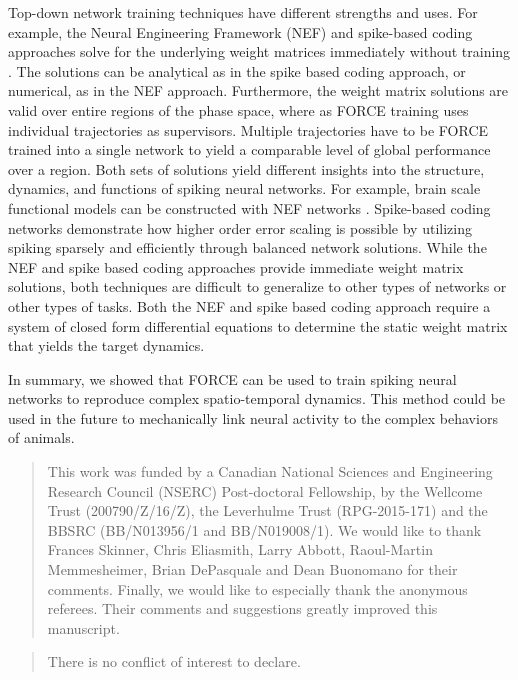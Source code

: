\documentclass[11pt]{article} %
\begin{document}
Top-down network training techniques have different strengths and uses.   
For example, the Neural Engineering Framework (NEF) and spike-based coding 
approaches solve for the underlying weight matrices immediately without 
training \cite{Deneve1,Deneve2,Ali,Chris1,Chris2}.  
The solutions can be analytical as in the spike based coding approach, 
or numerical, as in the NEF approach.  Furthermore, the weight matrix solutions 
are valid over entire regions of the phase space, where as FORCE training uses individual 
trajectories as supervisors.  
Multiple trajectories have to be FORCE trained into a single network to yield a 
comparable level of global performance over a region.   
Both sets of solutions yield different insights into the structure, dynamics, 
and functions of spiking neural networks.  
For example, brain scale functional models can be constructed with 
NEF networks \cite{Chris1}.  Spike-based coding networks demonstrate 
how higher order error scaling is possible by utilizing spiking sparsely and 
efficiently through balanced network solutions.  
While the NEF and spike based coding approaches provide immediate 
weight matrix solutions, both techniques are difficult to generalize 
to other types of networks or other types of tasks.  
Both the NEF and spike based coding approach require a system of closed 
form differential equations to determine the static weight matrix 
that yields the target dynamics.  

In summary, we showed that FORCE can be used to train spiking 
neural networks to reproduce complex spatio-temporal dynamics. 
This method could be used in the future to mechanically link neural 
activity to the complex behaviors of animals.

\renewcommand{\abstractname}{Acknowledgements}
\begin{abstract}
This work was funded by a Canadian National Sciences and 
Engineering Research Council (NSERC) Post-doctoral Fellowship, 
by the Wellcome Trust (200790/Z/16/Z), the Leverhulme Trust (RPG-2015-171) 
and the BBSRC (BB/N013956/1 and BB/N019008/1).  
We would like to thank Frances Skinner, Chris Eliasmith, Larry Abbott, 
Raoul-Martin Memmesheimer, Brian DePasquale and Dean Buonomano for their comments.  
Finally, we would like to especially thank the anonymous referees.  
Their comments and suggestions greatly improved this manuscript. 
\end{abstract}

\renewcommand{\abstractname}{Conflict of Interest} 
\begin{abstract}
There is no conflict of interest to declare.   
\end{abstract}
\end{document}
